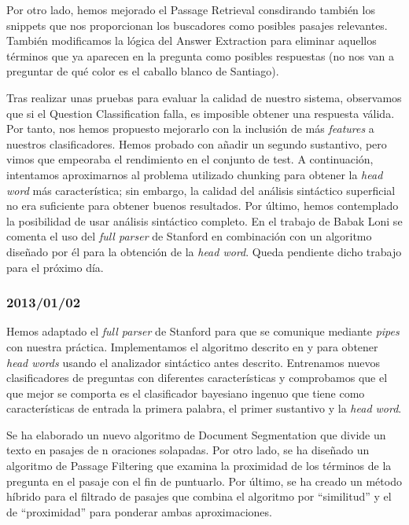 \documentclass[12pt,a4paper,titlepage]{article}
\begin{document}
Por otro lado, hemos mejorado el Passage Retrieval consdirando también los snippets que nos proporcionan los buscadores como posibles pasajes relevantes. También modificamos la lógica del Answer Extraction para eliminar aquellos términos que ya aparecen en la pregunta como posibles respuestas (no nos van a preguntar de qué color es el caballo blanco de Santiago).

Tras realizar unas pruebas para evaluar la calidad de nuestro sistema, observamos que si el Question Classification falla, es imposible obtener una respuesta válida. Por tanto, nos hemos propuesto mejorarlo con la inclusión de más \emph{features} a nuestros clasificadores. Hemos probado con añadir un segundo sustantivo, pero vimos que empeoraba el rendimiento en el conjunto de test. A continuación, intentamos aproximarnos al problema utilizado chunking para obtener la \emph{head word} más característica; sin embargo, la calidad del análisis sintáctico superficial no era suficiente para obtener buenos resultados. Por último, hemos contemplado la posibilidad de usar análisis sintáctico completo. En el trabajo de Babak Loni \cite{tesis:qc} se comenta el uso del \emph{full parser} de Stanford en combinación con un algoritmo diseñado por él para la obtención de la \emph{head word}. Queda pendiente dicho trabajo para el próximo día.

\subsubsection*{2013/01/02}
Hemos adaptado el \emph{full parser} de Stanford para que se comunique mediante \emph{pipes} con nuestra práctica. Implementamos el algoritmo descrito en \cite{tesis:qc} y \cite{paper:qc} para obtener \emph{head words} usando el analizador sintáctico antes descrito. Entrenamos nuevos clasificadores de preguntas con diferentes características y comprobamos que el que mejor se comporta es el clasificador bayesiano ingenuo que tiene como características de entrada la primera palabra, el primer sustantivo y la \emph{head word}.

Se ha elaborado un nuevo algoritmo de Document Segmentation que divide un texto en pasajes de n oraciones solapadas. Por otro lado, se ha diseñado un algoritmo de Passage Filtering que examina la proximidad de los términos de la pregunta en el pasaje con el fin de puntuarlo. Por último, se ha creado un método híbrido para el filtrado de pasajes que combina el algoritmo por ``similitud'' y el de ``proximidad'' para ponderar ambas aproximaciones.
\end{document}
